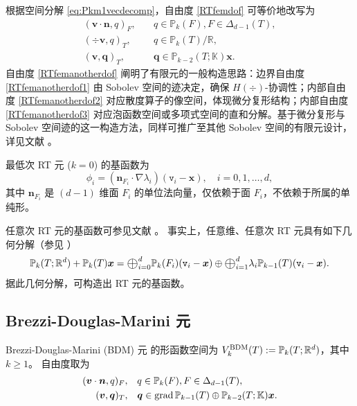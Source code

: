 根据空间分解 \eqref{eq:Pkm1vecdecomp}，自由度 \eqref{RTfemdof} 可等价地改写为
\begin{subequations}\label{RTfemanotherdof}
\begin{align}
(\boldsymbol v\cdot\boldsymbol  n, q)_F, & \quad q\in\mathbb P_{k}(F),  F\in\Delta_{d-1}(T),\label{RTfemanotherdof1}\\
(\div\boldsymbol v, q)_T, & \quad q\in\mathbb P_{k}(T)/\mathbb R, \label{RTfemanotherdof2}\\
(\boldsymbol v, \boldsymbol q)_T, & \quad \boldsymbol q\in\mathbb P_{k-2}(T;\mathbb K)\boldsymbol x. \label{RTfemanotherdof3}
\end{align}
\end{subequations} 
自由度 \eqref{RTfemanotherdof} 阐明了有限元的一般构造思路：边界自由度 \eqref{RTfemanotherdof1} 由 Sobolev 空间的迹决定，确保 $H(\div)$-协调性；内部自由度 \eqref{RTfemanotherdof2} 对应散度算子的像空间，体现微分复形结构；内部自由度 \eqref{RTfemanotherdof3} 对应泡函数空间或多项式空间的直和分解。基于微分复形与 Sobolev 空间迹的这一构造方法，同样可推广至其他 Sobolev 空间的有限元设计，详见文献 \cite{ChenHuang2022}。

最低次 RT 元 ($k=0$) 的基函数为 \cite[Section 2.6]{BoffiBrezziFortin2013}
$$
\phi_i=(\boldsymbol{n}_{F_i}\cdot\nabla\lambda_i)(\texttt{v}_i-\boldsymbol{x}),\quad i=0,1,\ldots,d,
$$
其中 $\boldsymbol{n}_{F_i}$ 是 $(d-1)$ 维面 $F_i$ 的单位法向量，仅依赖于面 $F_i$，不依赖于所属的单纯形。

任意次 RT 元的基函数可参见文献 \cite[Section 9, Tables 9.1-9.2]{ArnoldFalkWinther2009}。
事实上，任意维、任意次 RT 元具有如下几何分解（参见 \cite{ArnoldFalkWinther2009}）
$$
\mathbb P_k(T;\mathbb R^d)+\mathbb P_k(T)\bs x=\Oplus_{i=0}^d\mathbb P_{k}(F_{i})(\texttt{v}_i-\boldsymbol{x}) \oplus \Oplus_{i=1}^d\lambda_i\mathbb P_{k-1}(T)(\texttt{v}_i-\boldsymbol{x}).
$$
据此几何分解，可构造出 RT 元的基函数。



\subsection{Brezzi-Douglas-Marini 元}

Brezzi-Douglas-Marini (BDM) 元 \cite{BrezziDouglasMarini1985,BrezziDouglasDuranFortin1987,Nedelec1986,ChenHuang2022,ChenChenHuangWei2024,ChenHuang2024} 的形函数空间为 $V_k^{\rm BDM}(T):= \mathbb P_{k}(T; \mathbb R^d)$，其中 $k\geq1$。
自由度取为
\begin{subequations}\label{BDMfemdof}
\begin{align}
(\boldsymbol v\cdot\boldsymbol  n, q)_F, & \quad q\in\mathbb P_{k}(F),  F\in\Delta_{d-1}(T),\label{BDMfemdof1}\\
(\boldsymbol v, \boldsymbol q)_T, & \quad \boldsymbol q\in\operatorname{grad} \mathbb P_{k-1}(T)\oplus\mathbb P_{k-2}(T;\mathbb K)\boldsymbol x. \label{BDMfemdof2}
\end{align}
\end{subequations}



